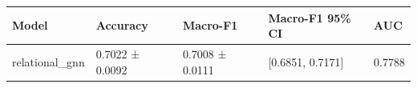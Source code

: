 \begin{tabular}{lllll}
\toprule
Model & Accuracy & Macro-F1 & Macro-F1 95\% CI & AUC \\
\midrule
relational\_gnn & 0.7022 ± 0.0092 & 0.7008 ± 0.0111 & [0.6851, 0.7171] & 0.7788 \\
\bottomrule
\end{tabular}
